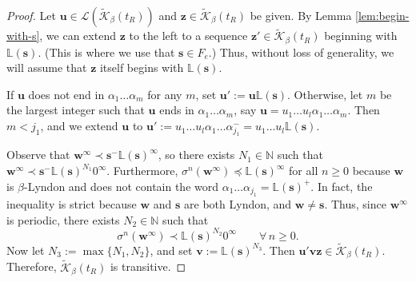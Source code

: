 \documentclass[11pt]{amsart}
\theoremstyle{definition}
\theoremstyle{remark}
\numberwithin{equation}{section}
\newcommand{\N}{\ensuremath{\mathbb{N}}}
\renewcommand{\L}{\ensuremath{\mathbb{L}}}
\newcommand{\Kt}{\widetilde{\mathcal{K}}}
\newcommand{\s}{ {\mathbf{s}}}
\newcommand{\cL}{\mathcal{L}}
\renewcommand{\u}{\mathbf{u}}
\renewcommand{\v}{\mathbf{v}}
\newcommand{\w}{\mathbf{w}}
\newcommand{\z}{\mathbf{z}}
\newcommand{\f}{\infty}
\newcommand{\al}{\alpha}
\newcommand{\lle}{\preccurlyeq}
\newcommand{\si}{\sigma}
\begin{document}
\begin{proof}
Let $\u\in\cL(\Kt_\beta(t_R))$ and $\z\in\Kt_\beta(t_R)$ be given. By Lemma \ref{lem:begin-with-s}, we can extend $\z$ to the left to a sequence $\z'\in\Kt_\beta(t_R)$ beginning with $\L(\s)$. {(This is where we use that $\s\in F_e$.)} 
Thus, without loss of generality, we will assume that $\z$ itself begins with $\L(\s)$.

If $\u$ does not end in $\al_1\dots\al_m$ for any $m$, set $\u':=\u\L(\s)$. Otherwise, let $m$ be the largest integer such that $\u$ ends in $\al_1\dots\al_m$, say $\u=u_1\dots u_l \al_1\dots\al_m$. Then $m<j_1$, and {we extend $\u$ to} $\u':=u_1\dots u_l\al_1\dots\al_{j_1}^-=u_1\dots u_l\L(\s)$.

Observe that $\w^\f\prec \s^-\L(\s)^\f$, so there exists $N_1\in\N$ such that $\w^\f\prec \s^-\L(\s)^{N_1}0^\f$. Furthermore, $\si^n(\w^\f)\lle \L(\s)^\f$ for all $n\geq 0$ {because $\w$ is $\beta$-Lyndon and does not contain the word $\al_1\dots\al_{j_1}=\L(\s)^+$.} In fact, the inequality is strict because $\w$ and $\s$ are both Lyndon, and $\w\neq \s$. Thus, since $\w^\f$ is periodic, there exists $N_2\in\N$ such that
\[
\si^n(\w^\f)\prec \L(\s)^{N_2}0^\f \qquad \forall\,n\geq 0.
\]
Now let $N_3:=\max\{N_1,N_2\}$, and set $\v:=\L(\s)^{N_3}$. Then $\u'\v\z\in\Kt_\beta(t_R)$. Therefore, $\Kt_\beta(t_R)$ is transitive.


\end{proof}
\end{document}
